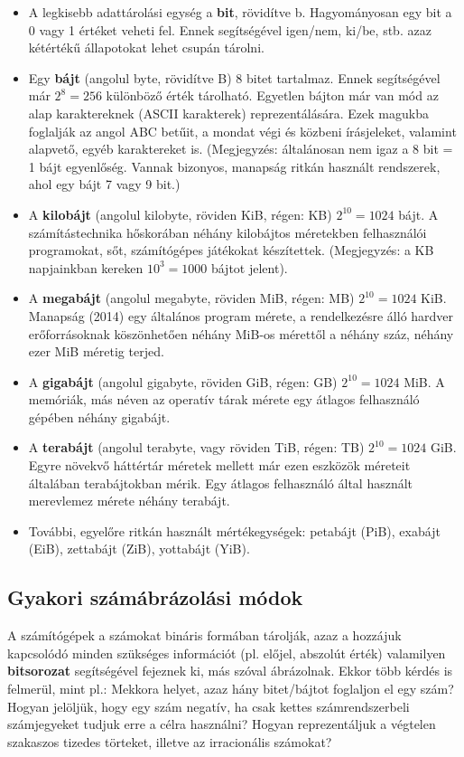 \begin{itemize}
  \item A legkisebb adattárolási egység a \textbf{bit}, rövidítve b. Hagyományosan egy bit a 0 vagy 1 értéket veheti fel. Ennek segítségével igen/nem, ki/be, stb. azaz kétértékű állapotokat lehet csupán tárolni.
  \item Egy \textbf{bájt} (angolul byte, rövidítve B) 8 bitet tartalmaz. Ennek segítségével már $2^8=256$ különböző érték tárolható. Egyetlen bájton már van mód az alap karaktereknek (ASCII karakterek) reprezentálására. Ezek magukba foglalják az angol ABC betűit, a mondat végi és közbeni írásjeleket, valamint alapvető, egyéb karaktereket is. (Megjegyzés: általánosan nem igaz a 8 bit = 1 bájt egyenlőség. Vannak bizonyos, manapság ritkán használt rendszerek, ahol egy bájt 7 vagy 9 bit.)
  \item A \textbf{kilobájt} (angolul kilobyte, röviden KiB, régen: KB) $2^{10} = 1024$ bájt. A számítástechnika hőskorában néhány kilobájtos méretekben felhasználói programokat, sőt, számítógépes játékokat készítettek. (Megjegyzés: a KB napjainkban kereken $10^3 = 1000$ bájtot jelent).
  \item A \textbf{megabájt} (angolul megabyte, röviden MiB, régen: MB) $2^{10} = 1024$ KiB. Manapság (2014) egy általános program mérete, a rendelkezésre álló hardver erőforrásoknak köszönhetően néhány MiB-os mérettől a néhány száz, néhány ezer MiB méretig terjed.
  \item A \textbf{gigabájt} (angolul gigabyte, röviden GiB, régen: GB) $2^{10} = 1024$ MiB. A memóriák, más néven az operatív tárak mérete egy átlagos felhasználó gépében néhány gigabájt.
  \item A \textbf{terabájt} (angolul terabyte, vagy röviden TiB, régen: TB) $2^{10} = 1024$ GiB. Egyre növekvő háttértár méretek mellett már ezen eszközök méreteit általában terabájtokban mérik. Egy átlagos felhasználó által használt merevlemez mérete néhány terabájt.
  \item További, egyelőre ritkán használt mértékegységek: petabájt (PiB), exabájt (EiB), zettabájt (ZiB), yottabájt (YiB).
\end{itemize}


\subsection{Gyakori számábrázolási módok}
A számítógépek a számokat bináris formában tárolják, azaz a hozzájuk kapcsolódó minden szükséges információt (pl. előjel, abszolút érték) valamilyen \textbf{bitsorozat} segítségével fejeznek ki, más szóval ábrázolnak. Ekkor több kérdés is felmerül, mint pl.: Mekkora helyet, azaz hány bitet/bájtot foglaljon el egy szám? Hogyan jelöljük, hogy egy szám negatív, ha csak kettes számrendszerbeli számjegyeket tudjuk erre a célra használni? Hogyan reprezentáljuk a végtelen szakaszos tizedes törteket, illetve az irracionális számokat?

